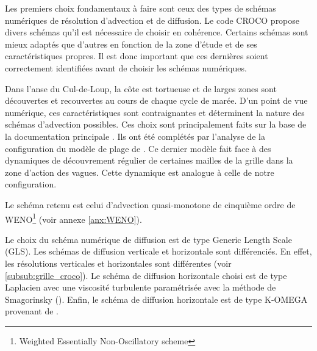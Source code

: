 \documentclass[10pt,a4paper,titlepage]{article}
\begin{document}
Les premiers choix fondamentaux à faire sont ceux des types de schémas numériques de résolution d'advection et de diffusion.
Le code CROCO propose divers schémas qu'il est nécessaire de choisir en cohérence. %
Certains schémas sont mieux adaptés que d'autres en fonction de la zone d'étude et de ses caractéristiques propres.
Il est donc important que ces dernières soient correctement identifiées avant de choisir les schémas numériques.

Dans l'anse du Cul-de-Loup, la côte est tortueuse et de larges zones sont découvertes et recouvertes au cours de chaque cycle de marée.
D'un point de vue numérique, ces caractéristiques sont contraignantes et déterminent la nature des schémas d'advection possibles.
Ces choix sont principalement faits sur la base de la documentation principale \parencite{cppkeys_description}.
Ils ont été complétés par l'analyse de la configuration du modèle de plage de  \cite{swash_article_MARCHESIELLO2021101816}.
Ce dernier modèle fait face à des dynamiques de découvrement régulier de certaines mailles de la grille dans la zone d'action des vagues.
Cette dynamique est analogue à celle de notre configuration.

Le schéma retenu est celui d'advection quasi-monotone de cinquième ordre de WENO\footnote{Weighted Essentially Non-Oscillatory scheme} (voir annexe \ref{anx:WENO}).

Le choix du schéma numérique de diffusion est de type Generic Length Scale (GLS).
Les schémas de diffusion verticale et horizontale sont différenciés.
En effet, les résolutions verticales et horizontales sont différentes (voir \ref{subsub:grille_croco}).
Le schéma de diffusion horizontale choisi est de type Laplacien avec une viscosité turbulente paramétrisée avec la méthode de Smagorinsky (\cite{schemas_diffusion_horizontale}).
Enfin, le schéma de diffusion horizontale est de type K-OMEGA provenant de \cite{GLS_KOMEGA_kolmogorov1941equations}.
\end{document}
